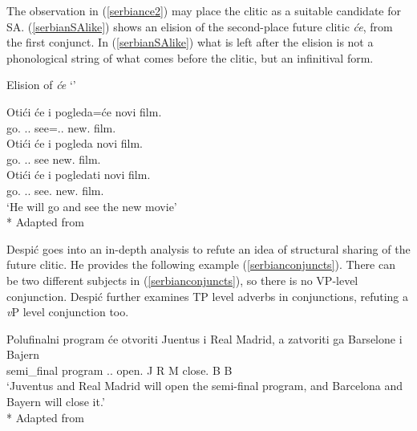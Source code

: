 The observation in (\ref{serbiance2}) may place the clitic as a suitable candidate for SA. (\ref{serbianSAlike}) shows an elision of the second-place future clitic \textit{\'{c}e}, from the first conjunct. In (\ref{serbianSAlike}) what is left after the elision is not a phonological string of what comes before the clitic, but an infinitival form.

\begin{exe}
    \ex \label{serbianSAlike} Elision of \textit{\'{c}e} `{\Fut}'
    \begin{xlist}
        \ex \gll Oti\'{c}i \'{c}e i pogleda=\'{c}e novi film. \\ 
        go.{\Inf} {\Aux}.{\Tsg}.{\Fut} {\And} see={\Aux}.{\Tsg}.{\Fut} new.{\Acc} film.{\Acc} \\
        
        \ex \gll *Oti\'{c}i \'{c}e i pogleda novi film. \\ 
        go.{\Inf} {\Aux}.{\Tsg}.{\Fut} {\And} see new.{\Acc} film.{\Acc} \\
        
        \ex \gll Oti\'{c}i \'{c}e i pogledati novi film. \\ 
        go.{\Inf} {\Aux}.{\Tsg}.{\Fut} {\And} see.{\Inf} new.{\Acc} film.{\Acc} \\
        \glt `He will go and see the new movie'\\*
        \hfill Adapted from \cite{despic2017suspended}
    \end{xlist}
\end{exe}

Despi\'{c} goes into an in-depth analysis to refute an idea of structural sharing of the future clitic. He provides the following example (\ref{serbianconjuncts}). There can be two different subjects in (\ref{serbianconjuncts}), so there is no VP-level conjunction. Despi\'c further examines TP level adverbs in conjunctions, refuting a \textit{v}P level conjunction too.

\begin{exe}
    \ex \label{serbianconjuncts}
    \gll Polufinalni program  \'{c}e otvoriti Juentus i {Real Madrid,} a zatvoriti ga Barselone i Bajern \\ semi\_final program {\Aux}.{\Tsg}.{\Fut} open.{\Inf} J {\And} {R M} {\And} close.{\Inf} {\Tsg} B {\And} B \\
    \glt `Juventus and Real Madrid will open the semi-final program, and Barcelona and Bayern will close it.' \\*
    \hfill Adapted from \cite{despic2017suspended}
\end{exe}

